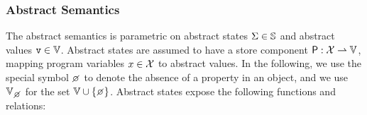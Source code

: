 \subsubsection{Abstract Semantics}

The abstract semantics is parametric on abstract states $\Sigma \in \mathbb{S}$ and abstract values $\mathtt{v} \in \mathbb{V}$.
Abstract states are assumed to have a store component ${\sf P}: \mathcal{X} \rightharpoonup \mathbb{V}$, mapping program variables $x \in \mathcal{X}$ to abstract values. 
In the following, we use the special symbol $\none$ to denote the absence of a property in an object, and we use $\setext{\absvals}{\none}$ for the set $\absvals \cup \{ \none \}$.
Abstract states expose the following functions and relations: 
